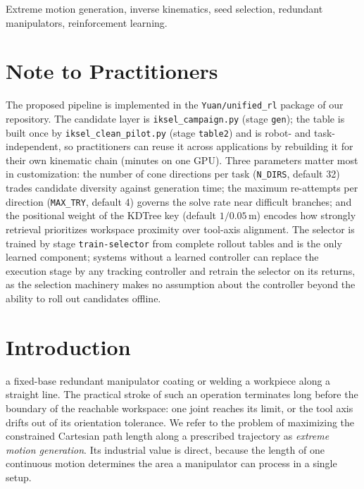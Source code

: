 \documentclass[journal]{IEEEtran}
\begin{document}
\begin{IEEEkeywords}
Extreme motion generation, inverse kinematics, seed selection, redundant
manipulators, reinforcement learning.
\end{IEEEkeywords}

\section*{Note to Practitioners}
The proposed pipeline is implemented in the \texttt{Yuan/unified\_rl}
package of our repository. The candidate layer is
\texttt{iksel\_campaign.py} (stage \texttt{gen}); the table is built once
by \texttt{iksel\_clean\_pilot.py} (stage \texttt{table2}) and is robot-
and task-independent, so practitioners can reuse it across applications
by rebuilding it for their own kinematic chain (minutes on one GPU).
Three parameters matter most in customization: the number of cone
directions per task (\texttt{N\_DIRS}, default 32) trades candidate
diversity against generation time; the maximum re-attempts per direction
(\texttt{MAX\_TRY}, default 4) governs the solve rate near difficult
branches; and the positional weight of the KDTree key (default
$1/0.05\,\mathrm{m}$) encodes how strongly retrieval prioritizes
workspace proximity over tool-axis alignment. The selector is trained by
stage \texttt{train-selector} from complete rollout tables and is the
only learned component; systems without a learned controller can replace
the execution stage by any tracking controller and retrain the selector
on its returns, as the selection machinery makes no assumption about the
controller beyond the ability to roll out candidates offline.

\section{Introduction}
 a fixed-base redundant manipulator coating or
welding a workpiece along a straight line. The practical stroke of such
an operation terminates long before the boundary of the reachable
workspace: one joint reaches its limit, or the tool axis drifts out of
its orientation tolerance. We refer to the problem of maximizing the
constrained Cartesian path length along a prescribed trajectory as
\textit{extreme motion generation}. Its industrial value is direct,
because the length of one continuous motion determines the area a
manipulator can process in a single setup.
\end{document}
